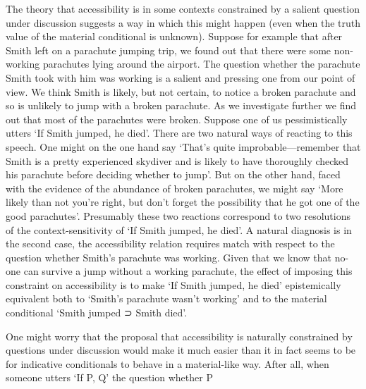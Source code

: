 \documentclass[If.tex]{subfiles}
\begin{document}
The theory that accessibility is in some contexts constrained by a salient question under discussion suggests a way in which this might happen (even when the truth value of the material conditional is unknown).  Suppose for example that after Smith left on a parachute jumping trip, we found out that there were some non-working parachutes lying around the airport.  The question whether the parachute Smith took with him was working is a salient and pressing one from our point of view.  We think Smith is likely, but not certain, to notice a broken parachute and so is unlikely to jump with a broken parachute.  As we investigate further we find out that most of the parachutes were broken.  Suppose one of us pessimistically utters ‘If Smith jumped, he died’.  There are two natural ways of reacting to this speech.  One might on the one hand say ‘That's quite improbable---remember that Smith is a pretty experienced skydiver and is likely to have thoroughly checked his parachute before deciding whether to jump’.  But on the other hand, faced with the evidence of the abundance of broken parachutes, we might say ‘More likely than not you're right, but don't forget the possibility that he got one of the good parachutes’.  Presumably these two reactions correspond to two resolutions of the context-sensitivity of ‘If Smith jumped, he died’.  A natural diagnosis is in the second case, the accessibility relation requires match with respect to the question whether Smith's parachute was working.  Given that we know that no-one can survive a jump without a working parachute, the effect of imposing this constraint on accessibility is to make ‘If Smith jumped, he died’ epistemically equivalent both to ‘Smith's parachute wasn't working’ and to the material conditional ‘Smith jumped ⊃ Smith died’.  

One might worry that the proposal that accessibility is naturally constrained by questions under discussion would make it much easier than it in fact seems to be for indicative conditionals to behave in a material-like way.  After all, when someone utters ‘If P, Q’ the question whether P 
\end{document}
